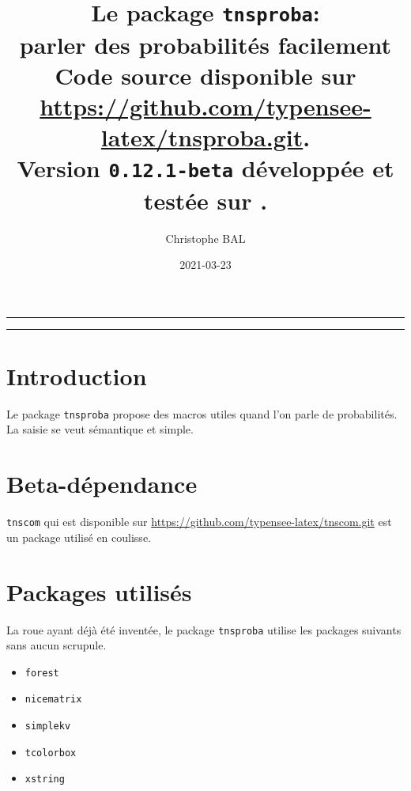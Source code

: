 \documentclass[12pt,a4paper]{article}
\theoremstyle{definition}
\begin{document}
\renewcommand\labelitemi{\raisebox{0.125em}{\tiny\textbullet}}
\renewcommand{\labelitemii}{---}

\title{  %
	Le package \texttt{tnsproba}:\\%
	parler des probabilités facilement\\%
	{\footnotesize Code source disponible sur \url{https://github.com/typensee-latex/tnsproba.git}.}\\%
{\footnotesize Version \texttt{0.12.1-beta} développée et testée sur \macosxname{}.}%
}
\author{Christophe BAL}
\date{2021-03-23}

\maketitle


\vspace{2em}

\hrule

\tableofcontents

\vspace{1.5em}

\hrule

\newpage

\section{Introduction}

Le package \verb+tnsproba+ propose des macros utiles quand l'on parle de probabilités. La saisie se veut sémantique et simple.


\section{Beta-dépendance}

\verb#tnscom# qui est disponible sur \url{https://github.com/typensee-latex/tnscom.git} est un package utilisé en coulisse.
\section{Packages utilisés}

La roue ayant déjà été inventée, le package \verb#tnsproba# utilise les packages suivants sans aucun scrupule.

\begin{multicols}{4}
    \begin{itemize}
        \item \verb#forest#
        \item \verb#nicematrix#
        \item \verb#simplekv#
        \item \verb#tcolorbox#
        \item \verb#xstring#
    \end{itemize}
\end{multicols}
\end{document}
